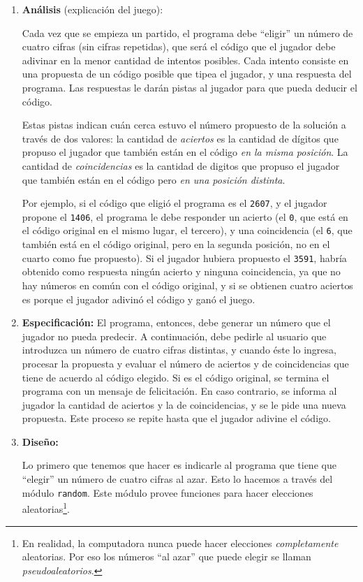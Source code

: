 \begin{enumerate}

\item {\bf Análisis } (explicación del juego):

Cada vez que se empieza un partido, el programa debe ``eligir'' un número de
cuatro cifras (sin cifras repetidas), que será el código que el jugador debe
adivinar en la menor cantidad de intentos posibles. Cada intento consiste en
una propuesta de un código posible que tipea el jugador, y una respuesta del
programa. Las respuestas le darán pistas al jugador para que pueda deducir el
código.

Estas pistas indican cuán cerca estuvo el número propuesto de la solución a
través de dos valores: la cantidad de {\it aciertos} es la cantidad de
dígitos que propuso el jugador que también están en el código {\it en la
misma posición}. La cantidad de {\it coincidencias} es la cantidad de
digitos que propuso el jugador que también están en el código pero {\it en
una posición distinta}.

Por ejemplo, si el código que eligió el programa es el \lstinline!2607!, y el
jugador propone el \lstinline!1406!, el programa le debe responder un acierto (el
\lstinline!0!, que está en el código original en el mismo lugar, el tercero), y
una coincidencia (el \lstinline!6!, que también está en el código original, pero
en la segunda posición, no en el cuarto como fue propuesto). Si el jugador
hubiera propuesto el \lstinline!3591!, habría obtenido como respuesta ningún
acierto y ninguna coincidencia, ya que no hay números en común con el
código original, y si se obtienen cuatro aciertos es porque el jugador
adivinó el código y ganó el juego.

\item {\bf Especificación: }
El programa, entonces, debe generar un número que el jugador no pueda predecir.
A continuación, debe pedirle al usuario que introduzca un número de cuatro
cifras distintas, y cuando éste lo ingresa, procesar la propuesta y evaluar el
número de aciertos y de coincidencias que tiene de acuerdo al código elegido. Si
es el código original, se termina el programa con un mensaje de felicitación. En
caso contrario, se informa al jugador la cantidad de aciertos y la de
coincidencias, y se le pide una nueva propuesta. Este proceso se repite hasta
que el jugador adivine el código.

\item {\bf Diseño:}
\label{str:disenno}

Lo primero que tenemos que hacer es indicarle al programa que tiene que
``elegir'' un número de cuatro cifras al azar. Esto lo hacemos a través del
módulo \lstinline!random!. Este módulo provee funciones para hacer elecciones
aleatorias\footnote{En realidad, la computadora nunca puede hacer
elecciones {\it completamente} aleatorias. Por eso los números ``al azar''
que puede elegir se llaman {\it pseudoaleatorios}.}.


\end{enumerate}
